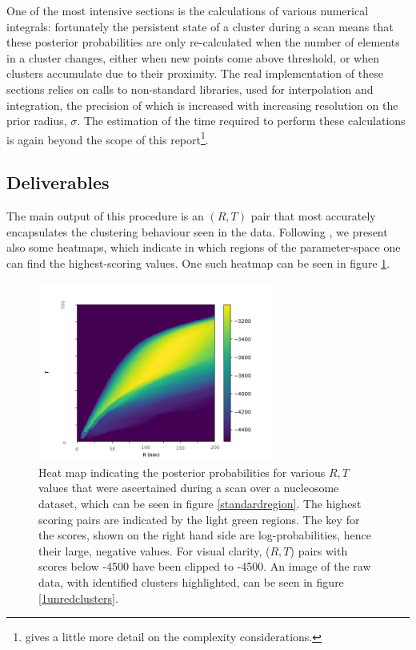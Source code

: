 \documentclass[11pt]{article}
\begin{document}
One of the most intensive sections is the calculations of various numerical integrals: fortunately the persistent state of a cluster during a scan means that these posterior probabilities are only re-calculated when the number of elements in a cluster changes, either when new points come above threshold, or when clusters accumulate due to their proximity. The real implementation of these sections relies on calls to non-standard libraries, used for interpolation and integration, the precision of which is increased with increasing resolution on the prior radius, $\sigma$. The estimation of the time required to perform these calculations is again beyond the scope of this report\footnote{\cite{williamson2020machine} gives a little more detail on the complexity considerations.}.

\subsection{Deliverables}

The main output of this procedure is an $(R,T)$ pair that most accurately encapsulates the clustering behaviour seen in the data. Following \cite{Rubin-Delanchy2015}, we present also some heatmaps, which indicate in which regions of the parameter-space one can find the highest-scoring values. One such heatmap can be seen in figure \ref{heatmap}.

\begin{figure}
\centering
\includegraphics[width=0.7\textwidth]{figs/heatmap.png}
\caption{Heat map indicating the posterior probabilities for various $R,T$ values that were ascertained during a scan over a nucleosome dataset, which can be seen in figure \ref{standardregion}. The highest scoring pairs are indicated by the light green regions. The key for the scores, shown on the right hand side are log-probabilities, hence their large, negative values. For visual clarity, ($R,T$) pairs with scores below -4500 have been clipped to -4500. An image of the raw data, with identified clusters highlighted, can be seen in figure \ref{1unredclusters}.}
\label{heatmap}
\end{figure}
 
\end{document}
